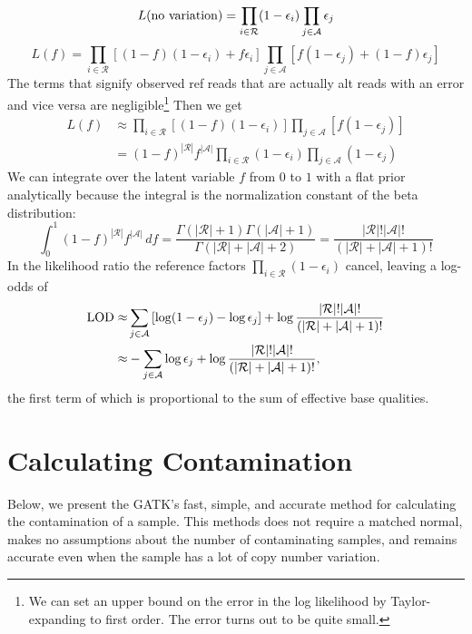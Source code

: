 \documentclass[nofootinbib,amssymb,amsmath]{revtex4}
\begin{document}
\begin{equation}
L({\rm no~variation}) = \prod_{i \in \mathcal{R}} (1 - \epsilon_i) \prod_{j \in \mathcal{A}} \epsilon_j 
\end{equation}
\begin{equation}
L(f) = \prod_{i \in \mathcal{R}} \left[ (1 -f)(1 - \epsilon_i) + f \epsilon_i \right] \prod_{j \in \mathcal{A}} \left[f(1 - \epsilon_j) + (1 - f) \epsilon_j \right]
\end{equation}
The terms that signify observed ref reads that are actually alt reads with an error and vice versa are negligible\footnote{We can set an upper bound on the error in the log likelihood by Taylor-expanding to first order.  The error turns out to be quite small.}  Then we get
\begin{align}
L(f) &\approx \prod_{i \in \mathcal{R}} \left[ (1 -f)(1 - \epsilon_i)  \right] \prod_{j \in \mathcal{A}} \left[f(1 - \epsilon_j) \right] \\
&=(1-f)^{|\mathcal{R}|}f^{|\mathcal{A}|}  \prod_{i \in \mathcal{R}} (1 - \epsilon_i)  \prod_{j \in \mathcal{A}} (1 - \epsilon_j) 
\end{align}
We can integrate over the latent variable $f$ from $0$ to $1$ with a flat prior analytically because the integral is the normalization constant of the beta distribution:
\begin{equation}
\int_0^1 (1-f)^{|\mathcal{R}|}f^{|\mathcal{A}|} \, df = \frac{ \Gamma(|\mathcal{R}| + 1) \Gamma(|\mathcal{A}| + 1)}{\Gamma(|\mathcal{R}| + |\mathcal{A}| + 2)} = \frac{|\mathcal{R}|! |\mathcal{A}|!}{(|\mathcal{R}|+|\mathcal{A}|+1)!}
\end{equation}
In the likelihood ratio the reference factors $\prod_{i \in \mathcal{R}} (1 - \epsilon_i)$ cancel, leaving a log-odds of
\begin{align}
{\rm LOD} \approx& \sum_{j \in \mathcal{A}} \left[ \log (1 - \epsilon_j) - \log \epsilon_j \right] + \log \frac{|\mathcal{R}|! |\mathcal{A}|!}{(|\mathcal{R}|+|\mathcal{A}|+1)!} \\
 \approx& -\sum_{j \in \mathcal{A}} \log \epsilon_j + \log \frac{|\mathcal{R}|! |\mathcal{A}|!}{(|\mathcal{R}|+|\mathcal{A}|+1)!},
\end{align}
the first term of which is proportional to the sum of effective base qualities.

\section{Calculating Contamination}
Below, we present the GATK's fast, simple, and accurate method for calculating the contamination of a sample.  This methods does not require a matched normal, makes no assumptions about the number of contaminating samples, and remains accurate even when the sample has a lot of copy number variation.
\end{document}
